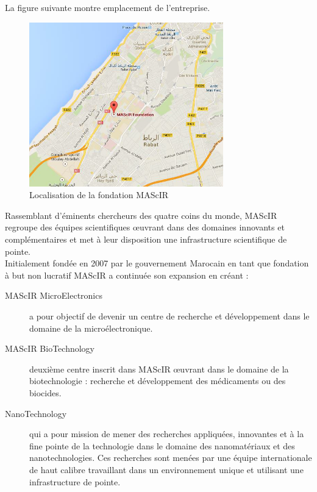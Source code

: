 \documentclass[11pt, a4paper, twoside]{book}
\begin{document}
La figure suivante montre emplacement de l’entreprise.

\begin{figure}[h]
\centering
\includegraphics[width=0.75\textwidth]{mascir_map}
\caption{Localisation de la fondation MAScIR}
\end{figure}

Rassemblant d’éminents chercheurs des quatre coins du monde, MAScIR regroupe des équipes scientifiques œuvrant dans des domaines innovants et complémentaires et met à leur disposition une infrastructure scientifique de pointe.\\

Initialement fondée en 2007 par le gouvernement Marocain en tant que fondation à but non lucratif MAScIR a continuée son expansion en créant :

\begin{description}
\item[MAScIR MicroElectronics] a pour objectif de devenir un centre de recherche et développement dans le domaine de la microélectronique.
\item[MAScIR BioTechnology] deuxième centre inscrit dans MAScIR œuvrant dans le domaine de la biotechnologie : recherche et développement des médicaments ou des biocides.
\item[NanoTechnology] qui a pour mission de mener des recherches appliquées, innovantes et à la fine pointe de la technologie dans le domaine des nanomatériaux et des nanotechnologies. Ces recherches sont menées par une équipe internationale de haut calibre travaillant dans un environnement unique et utilisant une infrastructure de pointe.
\end{description}
\end{document}
